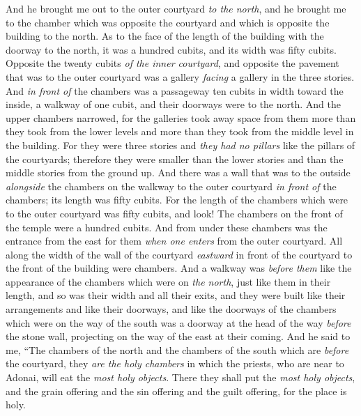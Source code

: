 \begin{biblechapter} %
 And he brought me out to the outer courtyard \textit{to the north}, and he brought me to the chamber which was opposite the courtyard and which is opposite the building to the north.
\verse As to the face of the length of the building with the doorway to the north, it was a hundred cubits, and its width was fifty cubits.
\verse Opposite the twenty cubits \textit{of the inner courtyard}, and opposite the pavement that was to the outer courtyard was a gallery \textit{facing} a gallery in the three stories.
\verse And \textit{in front of} the chambers was a passageway ten cubits in width toward the inside, a walkway of one cubit, and their doorways were to the north.
\verse And the upper chambers narrowed, for the galleries took away space from them more than they took from the lower levels and more than they took from the middle level in the building.
\verse For they were three stories and \textit{they had no pillars} like the pillars of the courtyards; therefore they were smaller than the lower stories and than the middle stories from the ground up.
\verse And there was a wall that was to the outside \textit{alongside} the chambers on the walkway to the outer courtyard \textit{in front of} the chambers; its length was fifty cubits.
\verse For the length of the chambers which were to the outer courtyard was fifty cubits, and look! The chambers on the front of the temple were a hundred cubits.
\verse And from under these chambers was the entrance from the east for them \textit{when one enters} from the outer courtyard.
\verse All along the width of the wall of the courtyard \textit{eastward} in front of the courtyard to the front of the building were chambers.
\verse And a walkway was \textit{before them} like the appearance of the chambers which were on \textit{the north}, just like them in their length, and so was their width and all their exits, and they were built like their arrangements and like their doorways,
\verse and like the doorways of the chambers which were on the way of the south was a doorway at the head of the way \textit{before} the stone wall, projecting on the way of the east at their coming.
\verse And he said to me, “The chambers of the north and the chambers of the south which are \textit{before} the courtyard, they \textit{are the holy chambers} in which the priests, who are near to Adonai, will eat the \textit{most holy objects}. There they shall put the \textit{most holy objects}, and the grain offering and the sin offering and the guilt offering, for the place is holy.

\end{biblechapter}
